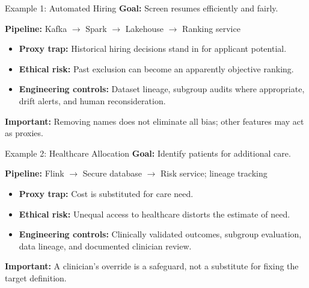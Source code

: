 \documentclass[aspectratio=43,10pt]{beamer}
\begin{document}
\begin{frame}{Example 1: Automated Hiring}
\textbf{Goal:} Screen resumes efficiently and fairly.

\medskip
\textbf{Pipeline:} Kafka $\rightarrow$ Spark $\rightarrow$ Lakehouse
$\rightarrow$ Ranking service

\medskip
\begin{itemize}
  \item \textbf{Proxy trap:} Historical hiring decisions
        stand in for applicant potential.
  \item \textbf{Ethical risk:} Past exclusion can become
        an apparently objective ranking.
  \item \textbf{Engineering controls:} Dataset lineage,
        subgroup audits where appropriate, drift alerts,
        and human reconsideration.
\end{itemize}

\medskip
\textbf{Important:} Removing names does not eliminate
all bias; other features may act as proxies.
\end{frame}

\begin{frame}{Example 2: Healthcare Allocation}
\textbf{Goal:} Identify patients for additional care.

\medskip
\textbf{Pipeline:} Flink $\rightarrow$ Secure database
$\rightarrow$ Risk service; lineage tracking

\medskip
\begin{itemize}
  \item \textbf{Proxy trap:} Cost is substituted for care need.
  \item \textbf{Ethical risk:} Unequal access to healthcare
        distorts the estimate of need.
  \item \textbf{Engineering controls:} Clinically validated
        outcomes, subgroup evaluation, data lineage,
        and documented clinician review.
\end{itemize}

\medskip
\textbf{Important:} A clinician's override is a safeguard,
not a substitute for fixing the target definition.
\end{frame}
\end{document}
